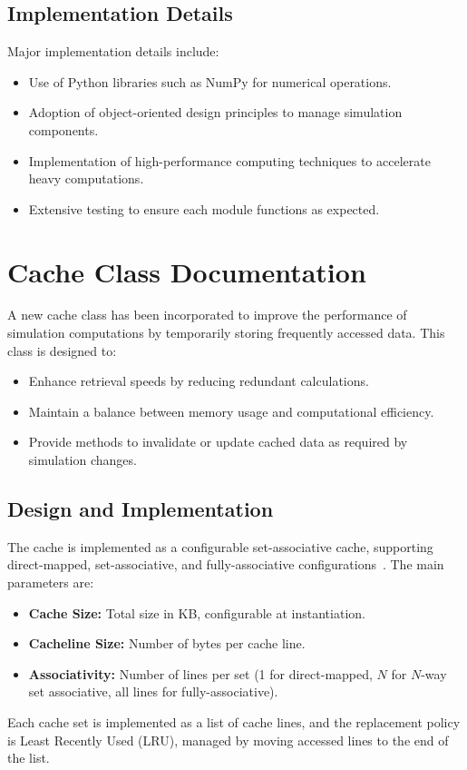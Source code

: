 \documentclass[12pt,a4paper]{report}
\begin{document}
\subsection{Implementation Details}
Major implementation details include:
\begin{itemize}
  \item Use of Python libraries such as NumPy for numerical operations.
  \item Adoption of object-oriented design principles to manage simulation components.
  \item Implementation of high-performance computing techniques to accelerate heavy computations.
  \item Extensive testing to ensure each module functions as expected.
\end{itemize}

\section{Cache Class Documentation}
A new cache class has been incorporated to improve the performance of simulation computations by temporarily storing frequently accessed data. This class is designed to:
\begin{itemize}
  \item Enhance retrieval speeds by reducing redundant calculations.
  \item Maintain a balance between memory usage and computational efficiency.
  \item Provide methods to invalidate or update cached data as required by simulation changes.
\end{itemize}

\subsection{Design and Implementation}
The cache is implemented as a configurable set-associative cache, supporting direct-mapped, set-associative, and fully-associative configurations~\cite{sciencedirect_set_associative}. The main parameters are:
\begin{itemize}
  \item \textbf{Cache Size:} Total size in KB, configurable at instantiation.
  \item \textbf{Cacheline Size:} Number of bytes per cache line.
  \item \textbf{Associativity:} Number of lines per set (1 for direct-mapped, $N$ for $N$-way set associative, all lines for fully-associative).
\end{itemize}
Each cache set is implemented as a list of cache lines, and the replacement policy is Least Recently Used (LRU), managed by moving accessed lines to the end of the list.
\end{document}
